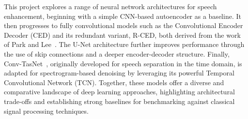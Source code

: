 \vspace{2em}
This project explores a range of neural network architectures for speech enhancement, beginning with a simple CNN-based autoencoder as a baseline. It then progresses to fully convolutional models such as the Convolutional Encoder Decoder (CED) and its redundant variant, R-CED, both derived from the work of Park and Lee~\cite{park2017acoustic}. The U-Net architecture further improves performance through the use of skip connections and a deeper encoder-decoder structure. Finally, Conv-TasNet~\cite{luo2019conv}, originally developed for speech separation in the time domain, is adapted for spectrogram-based denoising by leveraging its powerful Temporal Convolutional Network (TCN). Together, these models offer a diverse and comparative landscape of deep learning approaches, highlighting architectural trade-offs and establishing strong baselines for benchmarking against classical signal processing techniques.


